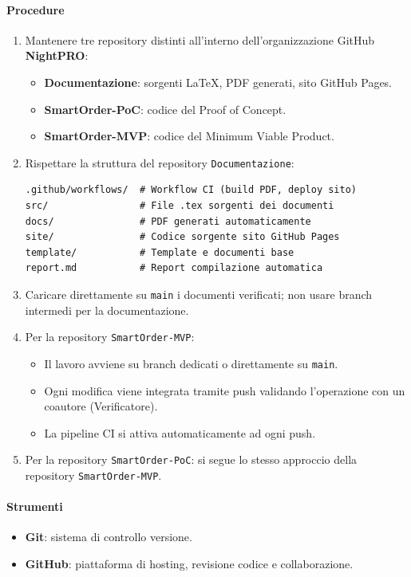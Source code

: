 \documentclass[a4paper, 11pt, oneside]{scrartcl}
\begin{document}
\paragraph{Procedure}
\begin{enumerate}
    \item Mantenere tre repository distinti all'interno dell'organizzazione GitHub \textbf{NightPRO}:
          \begin{itemize}
              \item \textbf{Documentazione}: sorgenti \LaTeX{}, PDF generati, sito GitHub Pages.
              \item \textbf{SmartOrder-PoC}: codice del Proof of Concept.
              \item \textbf{SmartOrder-MVP}: codice del Minimum Viable Product.
          \end{itemize}
    \item Rispettare la struttura del repository \texttt{Documentazione}:
          \begin{verbatim}
.github/workflows/  # Workflow CI (build PDF, deploy sito)
src/                # File .tex sorgenti dei documenti
docs/               # PDF generati automaticamente
site/               # Codice sorgente sito GitHub Pages
template/           # Template e documenti base
report.md           # Report compilazione automatica
\end{verbatim}
    \item Caricare direttamente su \texttt{main} i documenti verificati; non usare branch intermedi per la documentazione.
    \item Per la repository \texttt{SmartOrder-MVP}:
    \begin{itemize}
        \item Il lavoro avviene su branch dedicati o direttamente su \texttt{main}.
        \item Ogni modifica viene integrata tramite push validando l'operazione con un coautore (Verificatore).
        \item La pipeline CI si attiva automaticamente ad ogni push.
    \end{itemize}
    \item Per la repository \texttt{SmartOrder-PoC}: si segue lo stesso approccio della repository \texttt{SmartOrder-MVP}.
\end{enumerate}

\paragraph{Strumenti}
\begin{itemize}
    \item \textbf{Git}: sistema di controllo versione.
    \item \textbf{GitHub}: piattaforma di hosting, revisione codice e collaborazione.
\end{itemize}
\end{document}
